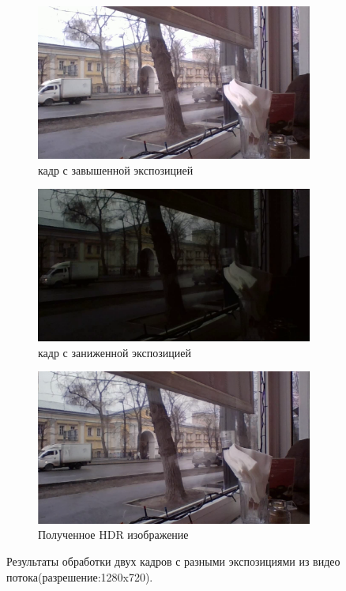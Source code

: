 \begin{figure}[!tbp]
  \centering
  \begin{subfigure}{.5\textwidth}
    \includegraphics[width=\textwidth]{img/exposure1_street_hd.png}
    \caption{ кадр с завышенной экспозицией}
    \label{fig:exposure1_street_hd}
  \end{subfigure}\hfill
  \begin{subfigure}{.5\textwidth}
    \includegraphics[width=\textwidth]{img/exposure2_street_hd.png}
    \caption{ кадр с заниженной экспозицией}
    \label{fig:exposure2_street_hd}
  \end{subfigure}\hfill
  \begin{subfigure}{1\textwidth}
    \includegraphics[width=\textwidth]{img/hdr_street_hd.png}
    \caption{ Полученное HDR изображение}
    \label{fig:hdr_street_deghost_hd}
  \end{subfigure}
  \caption { Результаты обработки двух кадров с разными экспозициями из видео потока(разрешение:1280x720).}
  \label{fig:hdr_street_hd_pipeline}
\end{figure}

